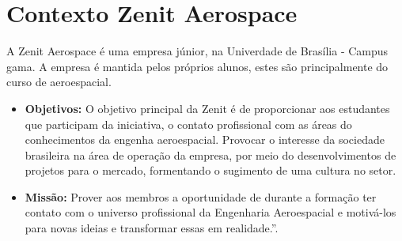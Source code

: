 \chapter[Contexto Zenit Aerospace]{Contexto Zenit Aerospace}
A Zenit Aerospace é uma empresa júnior, na Univerdade de Brasília - Campus gama. A empresa é mantida pelos próprios alunos, estes são principalmente do curso de aeroespacial. 
\begin{itemize}
\item \textbf{Objetivos:} O objetivo principal da Zenit é de proporcionar aos estudantes que participam da iniciativa, o contato profissional com as áreas do conhecimentos da engenha aeroespacial. Provocar o interesse da sociedade brasileira na área de operação da empresa, por meio do desenvolvimentos de projetos para o mercado, formentando o sugimento de uma cultura no setor. 
\item\textbf{Missão:} Prover aos membros a oportunidade de durante a formação ter contato com o universo profissional da Engenharia Aeroespacial e motivá-los para novas ideias e transformar essas em realidade.”\cite{regimentoZenit}.
\end{itemize}

